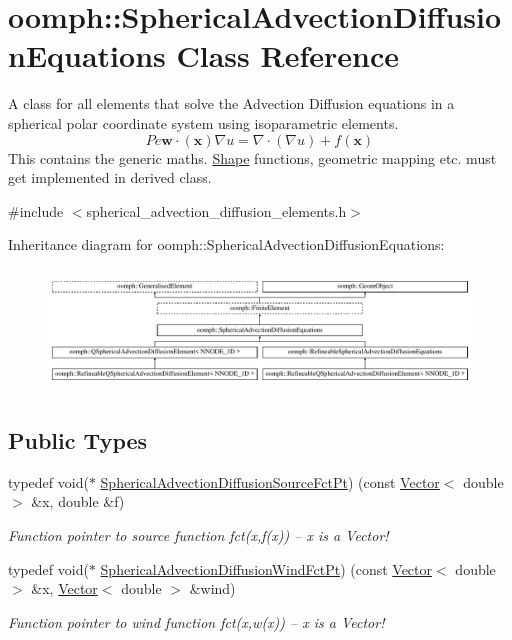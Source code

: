 \hypertarget{classoomph_1_1SphericalAdvectionDiffusionEquations}{}\section{oomph\+:\+:Spherical\+Advection\+Diffusion\+Equations Class Reference}
\label{classoomph_1_1SphericalAdvectionDiffusionEquations}


A class for all elements that solve the Advection Diffusion equations in a spherical polar coordinate system using isoparametric elements. \[ Pe \mathbf{w}\cdot(\mathbf{x}) \nabla u = \nabla \cdot \left( \nabla u \right) + f(\mathbf{x}) \] This contains the generic maths. \hyperlink{classoomph_1_1Shape}{Shape} functions, geometric mapping etc. must get implemented in derived class.  




{\ttfamily \#include $<$spherical\+\_\+advection\+\_\+diffusion\+\_\+elements.\+h$>$}

Inheritance diagram for oomph\+:\+:Spherical\+Advection\+Diffusion\+Equations\+:\begin{figure}[H]
\begin{center}
\leavevmode
\includegraphics[height=3.255814cm]{classoomph_1_1SphericalAdvectionDiffusionEquations}
\end{center}
\end{figure}
\subsection*{Public Types}
\begin{DoxyCompactItemize}
\item 
typedef void($\ast$ \hyperlink{classoomph_1_1SphericalAdvectionDiffusionEquations_aa02d787c43f88e46ad5e21c7b299b5cb}{Spherical\+Advection\+Diffusion\+Source\+Fct\+Pt}) (const \hyperlink{classoomph_1_1Vector}{Vector}$<$ double $>$ \&x, double \&f)
\begin{DoxyCompactList}\small\item\em Function pointer to source function fct(x,f(x)) -- x is a Vector! \end{DoxyCompactList}\item 
typedef void($\ast$ \hyperlink{classoomph_1_1SphericalAdvectionDiffusionEquations_adef9c036e9f80c134078d8d78049199e}{Spherical\+Advection\+Diffusion\+Wind\+Fct\+Pt}) (const \hyperlink{classoomph_1_1Vector}{Vector}$<$ double $>$ \&x, \hyperlink{classoomph_1_1Vector}{Vector}$<$ double $>$ \&wind)
\begin{DoxyCompactList}\small\item\em Function pointer to wind function fct(x,w(x)) -- x is a Vector! \end{DoxyCompactList}\end{DoxyCompactItemize}
